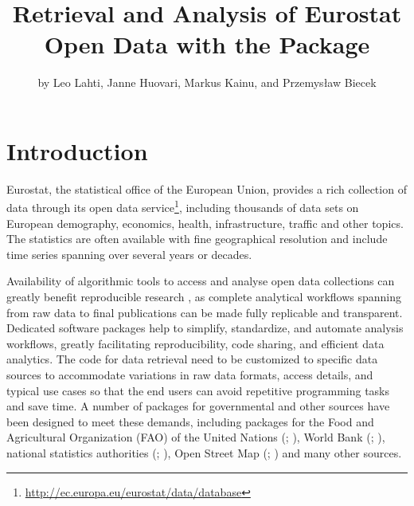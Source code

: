 \title{Retrieval and Analysis of Eurostat Open Data with the  Package}
\author{by Leo Lahti, Janne Huovari, Markus Kainu, and Przemys{\l}aw Biecek}

\maketitle


\section{Introduction}

Eurostat, the statistical office of the European Union, provides a
rich collection of data through its open data
service\footnote{\url{http://ec.europa.eu/eurostat/data/database}},
including thousands of data sets on European demography, economics,
health, infrastructure, traffic and other topics. The statistics are
often available with fine geographical resolution and include time
series spanning over several years or decades.

Availability of algorithmic tools to access and analyse open data
collections can greatly benefit reproducible research \citep{Gandrud13, Boettiger2015}, as complete analytical workflows spanning from raw data to final publications can be made fully replicable and transparent. Dedicated software packages help to simplify, standardize, and automate analysis workflows, greatly
facilitating reproducibility, code sharing, and efficient data
analytics. The code for data retrieval need to be customized to specific data
sources to accommodate variations in raw data formats, access details,
and typical use cases so that the end users can avoid repetitive
programming tasks and save time. A number of packages for governmental
and other sources have been designed to meet these demands, including
packages for the Food and Agricultural Organization (FAO) of the
United Nations (; \citealt{FAOSTAT}), World Bank
(; \citealt{WDI}), national statistics authorities (; \citealt{pxweb}), Open Street Map (; \citealt{osmar}) and many other sources.

